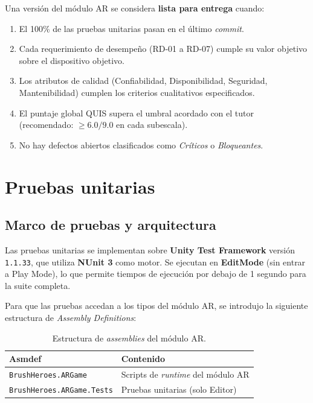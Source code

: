\documentclass[12pt, a4paper]{article}
\begin{document}
Una versión del módulo AR se considera \textbf{lista para entrega} cuando:

\begin{enumerate}[leftmargin=1.5cm, itemsep=3pt]
  \item El 100\% de las pruebas unitarias pasan en el último \textit{commit}.
  \item Cada requerimiento de desempeño (RD-01 a RD-07) cumple su valor objetivo
        sobre el dispositivo objetivo.
  \item Los atributos de calidad (Confiabilidad, Disponibilidad, Seguridad,
        Mantenibilidad) cumplen los criterios cualitativos especificados.
  \item El puntaje global QUIS supera el umbral acordado con el tutor
        (recomendado: $\geq 6.0/9.0$ en cada subescala).
  \item No hay defectos abiertos clasificados como \textit{Críticos} o
        \textit{Bloqueantes}.
\end{enumerate}

\section{Pruebas unitarias}

\subsection{Marco de pruebas y arquitectura}

Las pruebas unitarias se implementan sobre \textbf{Unity Test Framework}
versión \texttt{1.1.33}, que utiliza \textbf{NUnit 3} como motor. Se ejecutan
en \textbf{EditMode} (sin entrar a Play Mode), lo que permite tiempos de
ejecución por debajo de 1 segundo para la suite completa.

Para que las pruebas accedan a los tipos del módulo AR, se introdujo la
siguiente estructura de \textit{Assembly Definitions}:

\begin{table}[H]
  \centering
  \caption{Estructura de \textit{assemblies} del módulo AR.}
  \renewcommand{\arraystretch}{1.3}
  \begin{tabular}{p{5cm} p{8cm}}
    \toprule
    \textbf{Asmdef} & \textbf{Contenido} \\
    \midrule
    \texttt{BrushHeroes.ARGame}        & Scripts de \textit{runtime} del módulo AR \\
    \texttt{BrushHeroes.ARGame.Tests}  & Pruebas unitarias (solo Editor) \\
    \bottomrule
  \end{tabular}
\end{table}
\end{document}
